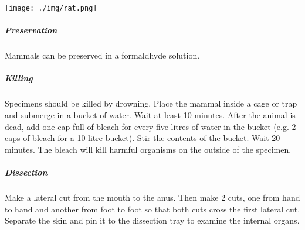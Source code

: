 \begin{multicols}{2}
\begin{center}
\texttt{[image: ./img/rat.png]}
\end{center}

%

\subparagraph{Preservation} 
Mammals can be preserved in a formaldhyde solution.

\subparagraph{Killing}
Specimens should be killed by drowning. Place the mammal inside a cage or trap and submerge in a bucket of water. Wait at least 10 minutes. After the animal is dead, add one cap full of bleach for every five litres of water in the bucket (e.g. 2 caps of bleach for a 10 litre bucket). Stir the contents of the bucket. Wait 20 minutes. The bleach will kill harmful organisms on the outside of the specimen.

\subparagraph{Dissection}
Make a lateral cut from the mouth to the anus. Then make 2 cuts, one from hand to hand and another from foot to foot so that both cuts cross the first lateral cut. Separate the skin and pin it to the dissection tray to examine the internal organs.

\end{multicols}

\setcounter{secnumdepth}{2}